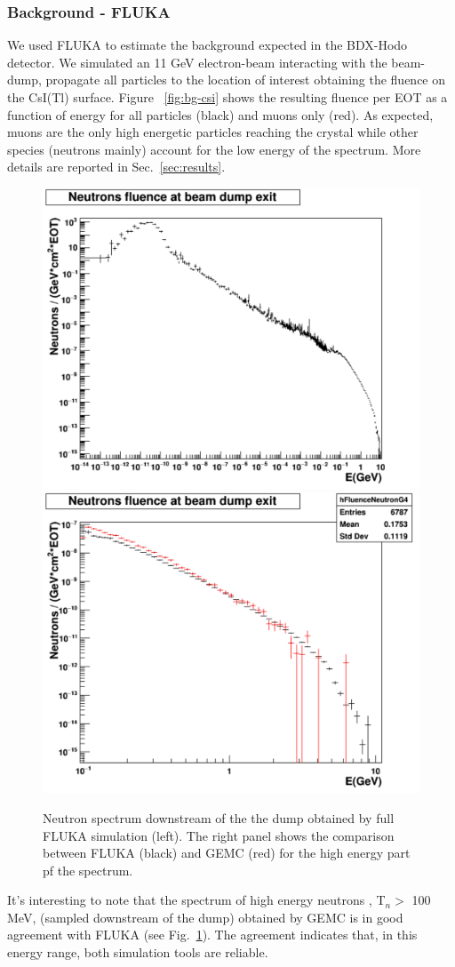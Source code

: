 \subsubsection{Background - FLUKA} 
We used FLUKA to estimate the background expected in the BDX-Hodo detector.
We simulated an 11 GeV electron-beam interacting with the beam-dump, propagate all particles to the location of interest obtaining the fluence on the CsI(Tl) surface.
Figure ~\ref{fig:bg-csi} shows the resulting fluence per EOT as a function of energy  for all particles (black) and muons only (red).
As expected,  muons are the only high energetic  particles reaching  the crystal while other species (neutrons mainly) account for the low energy of the spectrum. More details are reported in Sec.~\ref{sec:results}.
\begin{figure}[h!] 
\center
\includegraphics[width=8.cm]{figs/NeutronsDump_1D.pdf}    
\includegraphics[width=8.cm]{figs/NeutronsDumpComparison_1D.pdf}   
\caption{Neutron spectrum downstream of the the dump obtained by full FLUKA simulation (left). The right panel shows  the comparison between FLUKA (black) and GEMC (red) for the high energy part pf the spectrum.}
\label{fig:n-comp}
\end{figure}

It's interesting to note that the spectrum of  high energy neutrons , T$_n>$ 100 MeV,  (sampled downstream of the dump)  obtained by GEMC is in good agreement with FLUKA (see Fig.~\ref{fig:n-comp}). The agreement indicates  that, in this energy range, both simulation tools are reliable. 

